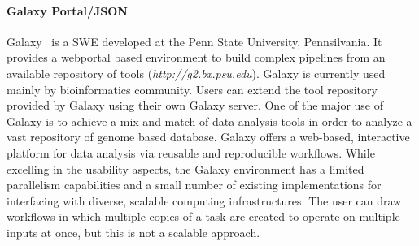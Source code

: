 \paragraph{Galaxy Portal/JSON} Galaxy~\cite{blankenberg-vonkuster-etal:2010} is a
SWE developed at the Penn State University, Pennsilvania. It provides a
webportal based environment to build complex pipelines from an available
repository of tools (\textit{http://g2.bx.psu.edu}).  Galaxy is currently used
mainly by bioinformatics community. Users can extend the tool repository
provided by Galaxy using their own Galaxy server. One of the major use of
Galaxy is to achieve a mix and match of data analysis tools in order to analyze
a vast repository of genome based database. Galaxy offers a web-based,
interactive platform for data analysis via reusable and reproducible workflows.
While excelling in the usability aspects, the Galaxy environment has a limited
parallelism capabilities and a small number of existing implementations for
interfacing with diverse, scalable computing infrastructures. The user can draw
workflows in which multiple copies of a task are created to operate on multiple
inputs at once, but this is not a scalable approach.

